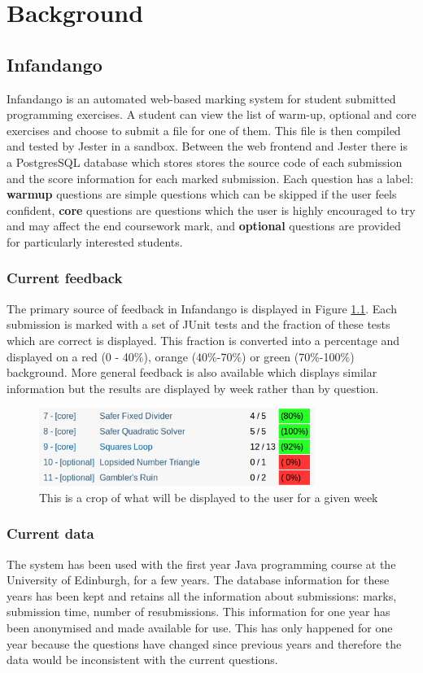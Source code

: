 \chapter{Background}
\label{background}
\section{Infandango}
Infandango is an automated web-based marking system for student submitted programming exercises. A student can view the list of warm-up, optional and core exercises and choose to submit a file for one of them. This file is then compiled and tested by Jester in a sandbox. Between the web frontend and Jester there is a PostgresSQL database which stores stores the source code of each submission and the score information for each marked submission.
Each question has a label: {\bf warmup} questions are simple questions which can be skipped if the user feels confident, {\bf core} questions are questions which the user is highly encouraged to try and may affect the end coursework mark, and {\bf optional} questions are provided for particularly interested students.
\subsection{Current feedback}
The primary source of feedback in Infandango is displayed in Figure \ref{fig:currentfeedback}. Each submission is marked with a set of JUnit tests and the fraction of these tests which are correct is displayed. This fraction is converted into a percentage and displayed on a red (0 - 40\%), orange (40\%-70\%) or green (70\%-100\%) background.
More general feedback is also available which displays similar information but the results are displayed by week rather than by question. 

\begin{figure}[p]
\centering
\includegraphics[width=0.8\textwidth]{images/currentfeedback.png}
\caption{This is a crop of what will be displayed to the user for a given week}
\label{fig:currentfeedback}
\end{figure}

\subsection{Current data}
The system has been used with the first year Java programming course at the University of Edinburgh, for a few years. The database information for these years has been kept and retains all the information about submissions: marks, submission time, number of resubmissions. This information for one year has been anonymised and made available for use. This has only happened for one year because the questions have changed since previous years and therefore the data would be inconsistent with the current questions.

